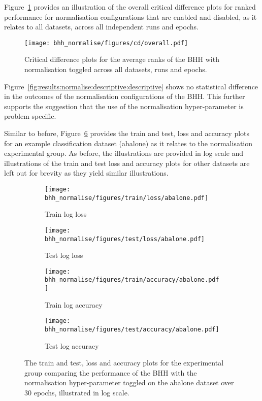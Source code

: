 Figure~\ref{fig:results:normalise:descriptive:cd} provides an illustration of the overall critical difference plots for ranked performance for normalisation configurations that are enabled and disabled, as it relates to all datasets, across all independent runs and epochs.

\begin{figure}[htb]
	\centering
	\texttt{[image: bhh\_normalise/figures/cd/overall.pdf]}
	\caption{Critical difference plots for the average ranks of the \acs{BHH} with normalisation toggled across all datasets, runs and epochs.}
	\label{fig:results:normalise:descriptive:cd}
\end{figure}

Figure~\ref{fig:results:normalise:descriptive:descriptive} shows no statistical difference in the outcomes of the normalisation configurations of the \acs{BHH}. This further supports the suggestion that the use of the normalisation hyper-parameter is problem specific.

Similar to before, Figure~\ref{fig:results:normalise:figures:abalone} provides the train and test, loss and accuracy plots for an example classification dataset (abalone) as it relates to the normalisation experimental group. As before, the illustrations are provided in log scale and illustrations of the train and test loss and accuracy plots for other datasets are left out for brevity as they yield similar illustrations.

\begin{figure}[htb]
	\begin{subfigure}{0.5\textwidth}
		\centering
		\texttt{[image: bhh\_normalise/figures/train/loss/abalone.pdf]}
		\caption{Train log loss}
		\label{fig:results:normalise:figures:loss:train:abalone}
	\end{subfigure}
	\begin{subfigure}{0.5\textwidth}
		\centering
		\texttt{[image: bhh\_normalise/figures/test/loss/abalone.pdf]}
		\caption{Test log loss}
		\label{fig:results:normalise:figures:loss:test:abalone}
	\end{subfigure}
	\par\bigskip
	\begin{subfigure}{0.5\textwidth}
		\centering
		\texttt{[image: bhh\_normalise/figures/train/accuracy/abalone.pdf]}
		\caption{Train log accuracy}
		\label{fig:results:normalise:figures:accuracy:train:abalone}
	\end{subfigure}
	\begin{subfigure}{0.5\textwidth}
		\centering
		\texttt{[image: bhh\_normalise/figures/test/accuracy/abalone.pdf]}
		\caption{Test log accuracy}
		\label{fig:results:normalise:figures:accuracy:test:abalone}
	\end{subfigure}
	\par\bigskip
	\caption{The train and test, loss and accuracy plots for the experimental group comparing the performance of the \acs{BHH} with the normalisation hyper-parameter toggled on the abalone dataset over 30 epochs, illustrated in log scale.}
	\label{fig:results:normalise:figures:abalone}
\end{figure}


